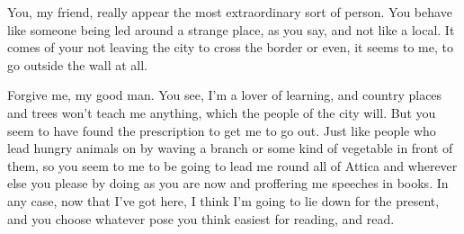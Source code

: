 You, my friend, really appear the most
extraordinary sort of
person. You behave like someone being led around a strange place, as you
say, and not like a local. It comes  of your not leaving the
city to cross the border or even, it seems to me, to go outside the wall
at all.

Forgive me, my good man. You see, I'm a lover of learning, and
country places and trees won't teach me anything,  which the
people of the city will.
But you seem to have found the
prescription to get me to
go out. Just like people who lead hungry animals on by waving a branch
or some kind of vegetable in front of them, so you seem to me to be
going to lead me round all of Attica and wherever else you please by
 doing as you are now and proffering me speeches in
books. In any case, now
that I've got here, I think I'm going to lie down for the present, and
you choose whatever pose you think easiest for reading, and read.


